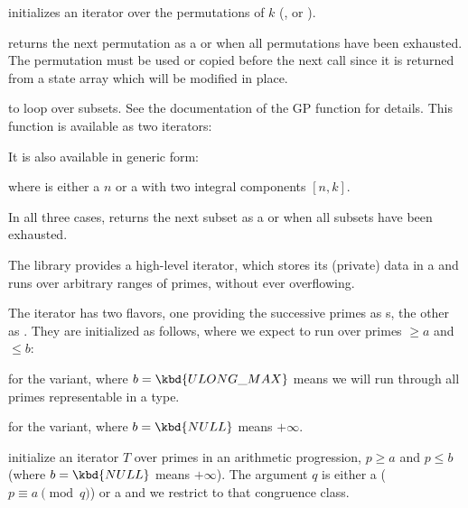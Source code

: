    initializes an iterator
  over the permutations of $k$ (,  or ).

   returns the next permutation
  as a  or  when all permutations have been
  exhausted. The permutation must be used or copied before the next call
  since it is returned from a state array which will be modified in place.

\item {} to loop over subsets. See the documentation
  of the  GP function for details. This function
  is available as two iterators:



  \noindent It is also available in generic form:

   where  is either
  a  $n$ or a  with two integral components $[n,k]$.

  In all three cases,  returns the
  next subset as a  or  when all subsets have been
  exhausted.

\label{se:primeiter}

The library provides a high-level iterator, which stores its (private) data
in a   and runs over arbitrary ranges of primes,
without ever overflowing.

The iterator has two flavors, one providing the successive primes as
s, the other as . They are initialized as follows,
where we expect to run over primes $\geq a$ and $\leq b$:

 for the
 variant, where $b = \kbd{ULONG\_MAX}$ means we will run through
all primes representable in a  type.

 for the 
variant, where $b = \kbd{NULL}$ means $+\infty$.

 initialize
an iterator $T$ over primes in an arithmetic progression, $p \geq a$ and $p
\leq b$ (where $b = \kbd{NULL}$ means $+\infty$). The argument $q$ is
either a  ($p \equiv a \pmod{q}$) or a  
and we restrict to that congruence class.


